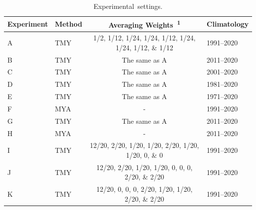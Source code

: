 \documentclass[atmosphere,article,accept,pdftex,moreauthors]{Definitions/mdpi}
\begin{document}
\begin{table}[H]
  \caption{Experimental~settings.\label{tab:exp}}
  \begin{tabularx}{\textwidth}{CCcC}
    \toprule
    \textbf{Experiment} & \textbf{Method} & \textbf{Averaging Weights~\textsuperscript{1}}         & \textbf{Climatology} \\
    \midrule
    A                   & TMY             & 1/2, 1/12, 1/24, 1/24, 1/12, 1/24, 1/24, 1/12, \& 1/12 & 1991--2020           \\
    B                   & TMY             & The same as A                                          & 2011--2020           \\
    C                   & TMY             & The same as A                                          & 2001--2020           \\
    D                   & TMY             & The same as A                                          & 1981--2020           \\
    E                   & TMY             & The same as A                                          & 1971--2020           \\
    F                   & MYA             & -                                                      & 1991--2020           \\
    G                   & TMY             & The same as A                                          & 2011--2020           \\
    H                   & MYA             & -                                                      & 2011--2020           \\
    I                   & TMY             & 12/20, 2/20, 1/20, 1/20, 2/20, 1/20, 1/20, 0, \& 0     & 1991--2020           \\
    J                   & TMY             & 12/20, 2/20, 1/20, 1/20, 0, 0, 0, 2/20, \& 2/20        & 1991--2020           \\
    K                   & TMY             & 12/20, 0, 0, 0, 2/20, 1/20, 1/20, 2/20, \& 2/20        & 1991--2020           \\
    \bottomrule
  \end{tabularx}
\end{table}
\end{document}

